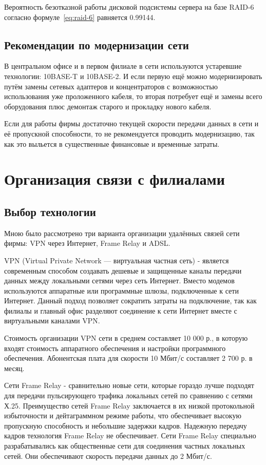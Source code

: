 \documentclass[russian,utf8,emptystyle]{eskdtext}
\begin{document}
Вероятность безотказной работы дисковой подсистемы сервера на базе RAID-6 согласно формуле~\ref{eq:raid-6} равняется 0.99144.

\subsection{Рекомендации по модернизации сети}
В центральном офисе и в первом филиале в сети используются устаревшие технологии: 10BASE-T и 10BASE-2. И если первую ещё можно модернизировать путём замены сетевых адаптеров и концентраторов с возможностью использования уже проложенного кабеля, то вторая потребует ещё и замены всего оборудования плюс демонтаж старого и прокладку нового кабеля.

Если для работы фирмы достаточно текущей скорости передачи данных в сети и её пропускной способности, то не рекомендуется проводить модернизацию, так как это выльется в существенные финансовые и временные затраты.

\clearpage
\section{Организация связи с филиалами}
\subsection{Выбор технологии}
Мною было рассмотрено три варианта организации удалённых связей сети фирмы: VPN через Интернет, Frame Relay и ADSL.

VPN (Virtual Private Network — виртуальная частная сеть) - является современным способом создавать дешевые и защищенные каналы передачи данных между локальными сетями через сеть Интернет. Вместо модемов используются аппаратные или программные шлюзы, подключенные к сети Интернет. Данный подход позволяет сократить затраты на подключение, так как филиалы и главный офис разделяют соединение к сети Интернет вместе с виртуальными каналами VPN.

Стоимость организации VPN сети в среднем составляет 10 000 р., в которую входят стоимость аппаратного обеспечения и настройки программного обеспечения. Абонентская плата для скорости 10 Мбит/с составляет 2 700 р. в месяц.

Сети Frame Relay - сравнительно новые сети, которые гораздо лучше подходят для передачи пульсирующего трафика локальных сетей по сравнению с сетями Х.25. Преимущество сетей Frame Relay заключается в их низкой протокольной избыточности и дейтаграммном режиме работы, что обеспечивает высокую пропускную способность и небольшие задержки кадров. Надежную передачу кадров технология Frame Relay не обеспечивает. Сети Frame Relay специально разрабатывались как общественные сети для соединения частных локальных сетей. Они обеспечивают скорость передачи данных до 2 Мбит/с.
\end{document}
